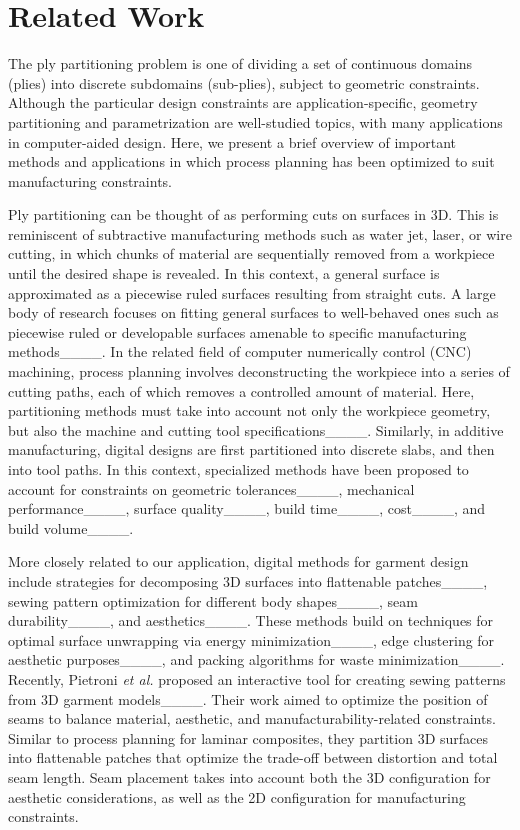 \section{Related Work}
\label{sec:related_work}

The ply partitioning problem is one of dividing a set of continuous domains (plies) into discrete subdomains (sub-plies), subject to geometric constraints. Although the particular design constraints are application-specific, geometry partitioning and parametrization are well-studied topics, with many applications in computer-aided design. Here, we present a brief overview of important methods and applications in which process planning has been optimized to suit manufacturing constraints.

Ply partitioning can be thought of as performing cuts on surfaces in 3D. This is reminiscent of subtractive manufacturing methods such as water jet, laser, or wire cutting, in which chunks of material are sequentially removed from a workpiece until the desired shape is revealed. In this context, a general surface is approximated as a piecewise ruled surfaces resulting from straight cuts. A large body of research focuses on fitting general surfaces to well-behaved ones such as piecewise ruled or developable surfaces amenable to specific manufacturing methods____. In the related field of computer numerically control (CNC) machining, process planning involves deconstructing the workpiece into a series of cutting paths, each of which removes a controlled amount of material. Here, partitioning methods must take into account not only the workpiece geometry, but also the machine and cutting tool specifications____. Similarly, in additive manufacturing, digital designs are first partitioned into discrete slabs, and then into tool paths. In this context, specialized methods have been proposed to account for constraints on geometric tolerances____, mechanical performance____, surface quality____, build time____, cost____, and build volume____.

More closely related to our application, digital methods 
for garment design include strategies for decomposing 3D surfaces into flattenable patches____, sewing pattern optimization for different body shapes____, seam durability____, and aesthetics____. These methods build on techniques for optimal surface unwrapping via energy minimization____, edge clustering for aesthetic purposes____, and packing algorithms for waste minimization____.
Recently, Pietroni \emph{et al.} proposed an interactive tool for creating sewing patterns from 3D garment models____. Their work aimed to optimize the position of seams to balance material, aesthetic, and manufacturability-related constraints. Similar to process planning for laminar composites, they partition 3D surfaces into flattenable patches that optimize the trade-off between distortion and total seam length. Seam placement takes into account both the 3D configuration for aesthetic considerations, as well as the 2D configuration for manufacturing constraints.

